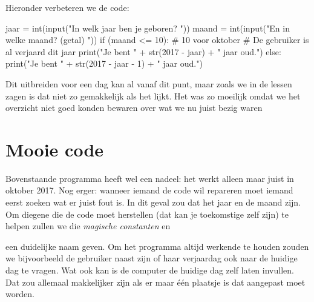   Hieronder verbeteren we de code:
  \begin{python}
    jaar  = int(input("In welk jaar ben je geboren? "))
    maand = int(input("En in welke maand? (getal) "))
    if (maand <= 10): # 10 voor oktober
      # De gebruiker is al verjaard dit jaar
      print("Je bent " + str(2017 - jaar) + " jaar oud.")
    else:
      print("Je bent " + str(2017 - jaar - 1) + " jaar oud.")
  \end{python}
  Dit uitbreiden voor een dag kan al vanaf dit punt, maar zoals we in de lessen
  zagen is dat niet zo gemakkelijk als het lijkt. Het was zo moeilijk omdat we
  het overzicht niet goed konden bewaren over wat we nu juist bezig waren

\section{Mooie code}
  Bovenstaande programma heeft wel een nadeel: het werkt alleen maar juist in
  oktober 2017. Nog erger: wanneer iemand de code wil repareren moet iemand
  eerst zoeken wat er juist fout is. In dit geval zou dat het jaar en de maand
  zijn. Om diegene die de code moet herstellen (dat kan je toekomstige zelf
  zijn) te helpen zullen we die \emph{magische constanten}  en 
  een duidelijke naam geven. Om het programma altijd werkende te houden zouden
  we bijvoorbeeld de gebruiker naast zijn of haar verjaardag ook naar de
  huidige dag te vragen. Wat ook kan is de computer de huidige dag zelf laten
  invullen. Dat zou allemaal makkelijker zijn als er maar \'e\'en plaatsje is dat
  aangepast moet worden.

